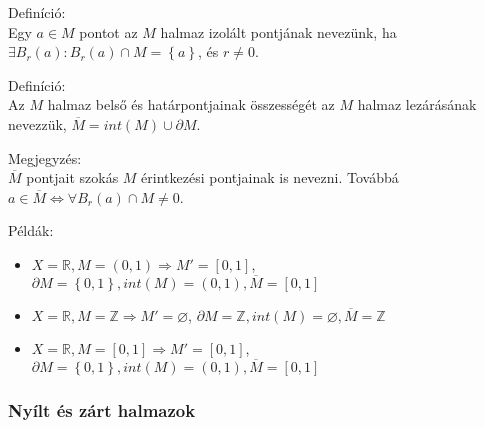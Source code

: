 \documentclass[12pt,a4paper]{scrartcl}
\providecommand{\tightlist}{%
  \setlength{\itemsep}{0pt}\setlength{\parskip}{0pt}}
\newenvironment{definicio}{}{}
\newenvironment{pelda}{}{}
\begin{document}
\begin{def_extra}

Definíció:\\
Egy \(a \in M\) pontot az \(M\) halmaz izolált pontjának nevezünk, ha
\(\exists B_{r}\left( a \right):B_{r}\left( a \right) \cap M = \left\{ a \right\}\),
és \(r \neq 0\).

\end{def_extra}

\begin{definicio}

Definíció:\\
Az \(M\) halmaz belső és határpontjainak összességét az \(M\) halmaz
lezárásának nevezzük,
\(\overline{M} = {int}\left( M \right) \cup \partial M\).

\end{definicio}

\begin{megj_extra}

Megjegyzés:\\
\(\overline{M}\) pontjait szokás \(M\) érintkezési pontjainak is
nevezni. Továbbá
\(\left. a \in \overline{M}\Leftrightarrow\forall B_{r}\left( a \right) \cap M \neq 0 \right.\).

\end{megj_extra}

\begin{pelda}

Példák:

\begin{itemize}
\tightlist
\item
  \(\left. X = {\mathbb{R}},M = \left( 0,1 \right)\Rightarrow M' = \left\lbrack 0,1 \right\rbrack \right.\),
  \(\partial M = \left\{ 0,1 \right\},{int}\left( M \right) = \left( 0,1 \right),\overline{M} = \left\lbrack 0,1 \right\rbrack\)
\item
  \(\left. X = {\mathbb{R}},M = {\mathbb{Z}}\Rightarrow M' = \varnothing \right.\),
  \(\partial M = {\mathbb{Z}},{int}\left( M \right) = \varnothing,\overline{M} = {\mathbb{Z}}\)
\item
  \(\left. X = {\mathbb{R}},M = \left\lbrack 0,1 \right\rbrack\Rightarrow M' = \left\lbrack 0,1 \right\rbrack \right.\),
  \(\partial M = \left\{ 0,1 \right\},{int}\left( M \right) = \left( 0,1 \right),\overline{M} = \left\lbrack 0,1 \right\rbrack\)
\end{itemize}

\end{pelda}

\hypertarget{nyilt-es-zart-halmazok}{%
\subsubsection{Nyílt és zárt halmazok}\label{nyilt-es-zart-halmazok}}
\end{document}
